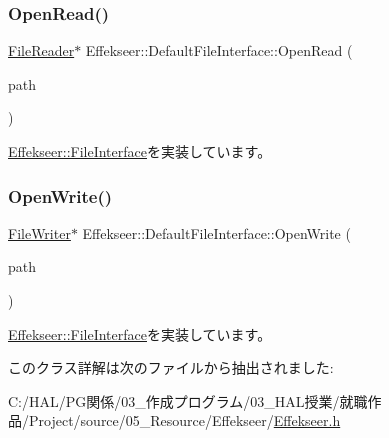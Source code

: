 \subsubsection{\texorpdfstring{Open\+Read()}{OpenRead()}}
{\footnotesize\ttfamily \mbox{\hyperlink{class_effekseer_1_1_file_reader}{File\+Reader}}$\ast$ Effekseer\+::\+Default\+File\+Interface\+::\+Open\+Read (\begin{DoxyParamCaption}\item[{const \mbox{\hyperlink{_effekseer_8h_aca7eb5de6dd019c19ac58ea35a193f2f}{E\+F\+K\+\_\+\+C\+H\+AR}} $\ast$}]{path }\end{DoxyParamCaption})\hspace{0.3cm}{\ttfamily [virtual]}}



\mbox{\hyperlink{class_effekseer_1_1_file_interface_ad8744ad57226d9a2ce74f6ef6e2f9a41}{Effekseer\+::\+File\+Interface}}を実装しています。

\mbox{\label{class_effekseer_1_1_default_file_interface_aecbcd4350ca701360dcea88a2c5f9c64}} 
\subsubsection{\texorpdfstring{Open\+Write()}{OpenWrite()}}
{\footnotesize\ttfamily \mbox{\hyperlink{class_effekseer_1_1_file_writer}{File\+Writer}}$\ast$ Effekseer\+::\+Default\+File\+Interface\+::\+Open\+Write (\begin{DoxyParamCaption}\item[{const \mbox{\hyperlink{_effekseer_8h_aca7eb5de6dd019c19ac58ea35a193f2f}{E\+F\+K\+\_\+\+C\+H\+AR}} $\ast$}]{path }\end{DoxyParamCaption})\hspace{0.3cm}{\ttfamily [virtual]}}



\mbox{\hyperlink{class_effekseer_1_1_file_interface_a1e60cb81a5cae39b37e44570ef693d91}{Effekseer\+::\+File\+Interface}}を実装しています。



このクラス詳解は次のファイルから抽出されました\+:\begin{DoxyCompactItemize}
\item 
C\+:/\+H\+A\+L/\+P\+G関係/03\+\_\+作成プログラム/03\+\_\+\+H\+A\+L授業/就職作品/\+Project/source/05\+\_\+\+Resource/\+Effekseer/\mbox{\hyperlink{_effekseer_8h}{Effekseer.\+h}}\end{DoxyCompactItemize}
